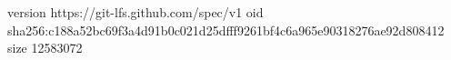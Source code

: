 version https://git-lfs.github.com/spec/v1
oid sha256:c188a52bc69f3a4d91b0c021d25dfff9261bf4c6a965e90318276ae92d808412
size 12583072
